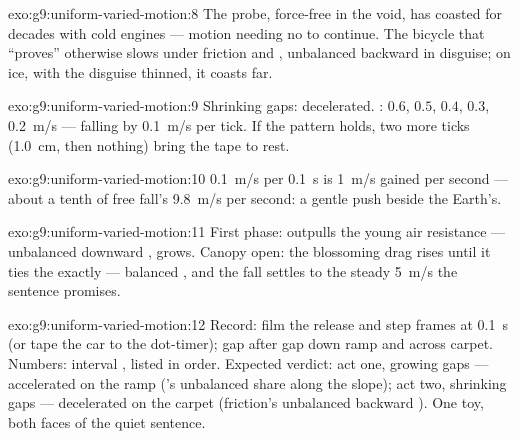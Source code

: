 \begin{solution}{exo:g9:uniform-varied-motion:8}
The probe, force-free in the void, has coasted for decades
with cold engines --- motion needing no  to continue.
The bicycle that ``proves'' otherwise slows under friction
and , unbalanced backward  in disguise; on ice, with
the disguise thinned, it coasts far.
\end{solution}

\begin{solution}{exo:g9:uniform-varied-motion:9}
Shrinking gaps: decelerated. : $0.6$, $0.5$, $0.4$,
$0.3$, \qty{0.2}{m/s} --- falling by \qty{0.1}{m/s} per tick.
If the pattern holds, two more ticks (\qty{1.0}{cm}, then
nothing) bring the tape to rest.
\end{solution}

\begin{solution}{exo:g9:uniform-varied-motion:10}
\qty{0.1}{m/s} per \qty{0.1}{s} is \qty{1}{m/s} gained per
second --- about a tenth of free fall's \qty{9.8}{m/s} per
second: a gentle push beside the Earth's.
\end{solution}

\begin{solution}{exo:g9:uniform-varied-motion:11}
First phase:  outpulls the young air resistance ---
unbalanced downward ,  grows. Canopy open: the
blossoming  drag rises until it ties the  exactly
--- balanced , and the fall settles to the steady
\qty{5}{m/s} the sentence promises.
\end{solution}

\begin{solution}{exo:g9:uniform-varied-motion:12}
Record: film the release and step frames at \qty{0.1}{s} (or
tape the car to the dot-timer);  gap after gap down
ramp and across carpet. Numbers: interval , listed in
order. Expected verdict: act one, growing gaps --- accelerated
on the ramp ('s unbalanced share along the slope); act
two, shrinking gaps --- decelerated on the carpet (friction's
unbalanced backward ). One toy, both faces of the quiet
sentence.
\end{solution}

